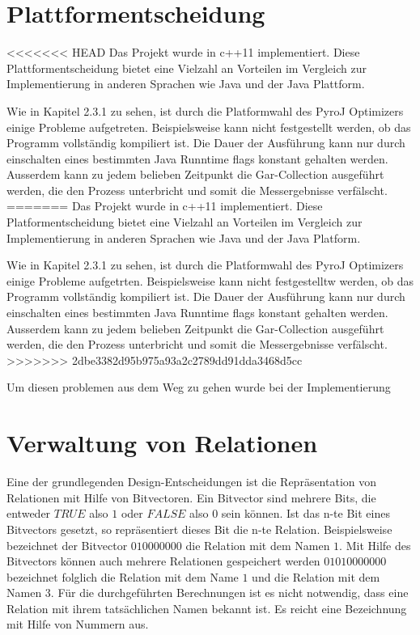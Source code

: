 \section{Plattformentscheidung}

<<<<<<< HEAD
Das Projekt wurde in c++11 implementiert. Diese Plattformentscheidung bietet eine Vielzahl an Vorteilen im Vergleich zur Implementierung in anderen Sprachen wie Java und der Java Plattform.

Wie in Kapitel 2.3.1 zu sehen, ist durch die Platformwahl des PyroJ Optimizers einige Probleme aufgetreten. Beispielsweise kann nicht festgestellt werden, ob das Programm vollständig kompiliert ist. Die Dauer der Ausführung kann nur durch einschalten eines bestimmten Java Runntime flags konstant gehalten werden. Ausserdem kann zu jedem belieben Zeitpunkt die Gar-Collection ausgeführt werden, die den Prozess unterbricht und somit die Messergebnisse verfälscht.
=======
Das Projekt wurde in c++11 implementiert. Diese Platformentscheidung bietet eine Vielzahl an Vorteilen im Vergleich zur Implementierung in anderen Sprachen wie Java und der Java Platform.

Wie in Kapitel 2.3.1 zu sehen, ist durch die Platformwahl des PyroJ Optimizers einige Probleme aufgetrten. Beispielsweise kann nicht festgestelltw werden, ob das Programm vollständig kompiliert ist. Die Dauer der Ausführung kann nur durch einschalten eines bestimmten Java Runntime flags konstant gehalten werden. Ausserdem kann zu jedem belieben Zeitpunkt die Gar-Collection ausgeführt werden, die den Prozess unterbricht und somit die Messergebnisse verfälscht.
>>>>>>> 2dbe3382d95b975a93a2c2789dd91dda3468d5cc

Um diesen problemen aus dem Weg zu gehen wurde bei der Implementierung


\section{Verwaltung von Relationen}

Eine der grundlegenden Design-Entscheidungen ist die Repräsentation von Relationen mit Hilfe von Bitvectoren. Ein Bitvector sind mehrere Bits, die entweder $TRUE$ also $1$ oder $FALSE$ also $0$ sein können. Ist das n-te Bit eines Bitvectors gesetzt, so repräsentiert dieses Bit die n-te Relation. Beispielsweise bezeichnet der Bitvector $010000000$ die Relation mit dem Namen $1$. Mit Hilfe des Bitvectors können auch mehrere Relationen gespeichert werden $01010000000$ bezeichnet folglich die Relation mit dem Name $1$ und die Relation mit dem Namen $3$. Für die durchgeführten Berechnungen ist es nicht notwendig, dass eine Relation mit ihrem tatsächlichen Namen bekannt ist. Es reicht eine Bezeichnung mit Hilfe von Nummern aus.

